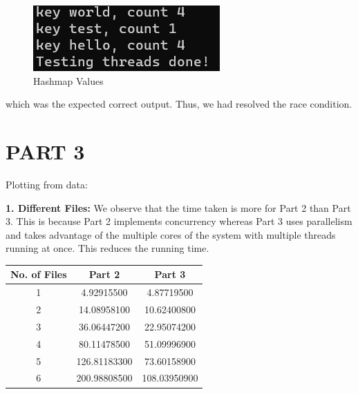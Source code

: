 \documentclass[notitlepage]{report}
\begin{document}
\begin{figure}[hbp]
    \centering
    \includegraphics[width = 0.35\linewidth]{checkpoint3_withBucket.png}
    \caption*{Hashmap Values}
\end{figure}
\noindent which was the expected correct output. Thus, we had resolved the race condition.

\pagebreak

\section*{PART 3}

Plotting from data:

\begin{multicols}{2}
\noindent \textbf{1. Different Files: }
 We observe that the time taken is more for Part 2 than Part 3. This is because Part 2 implements concurrency whereas Part 3 uses parallelism and takes advantage of the multiple cores of the system with multiple threads running at once. This reduces the running time.


\columnbreak
\begin{center}
\begin{tabular}{ |c|c|c| } 
\hline
 No. of Files & Part 2 & Part 3 \\
 \hline
 1 & 4.92915500 & 4.87719500\\ 
 2 & 14.08958100 & 10.62400800\\ 
 3 & 36.06447200 & 22.95074200\\ 
 4 & 80.11478500 & 51.09996900\\ 
 5 & 126.81183300 & 73.60158900\\ 
 6 & 200.98808500 & 108.03950900\\ 
 \hline
\end{tabular}
\end{center}

\centering
{}
\end{multicols}
\end{document}

